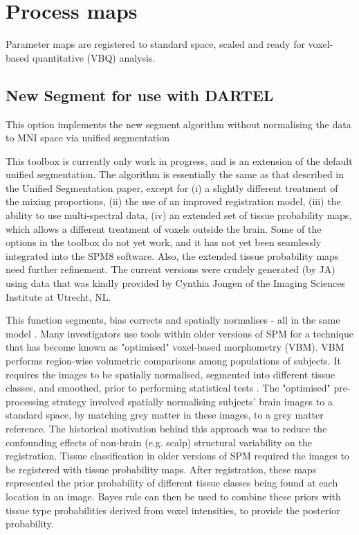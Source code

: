 
\chapter{Process maps  \label{Chap:proc}}

\vskip 1.5cm

Parameter maps are registered to standard space, scaled and ready for voxel-based quantitative (VBQ) analysis.


\section{New Segment for use with DARTEL}
This option implements the new segment algorithm without normalising the data to MNI space via unified segmentation

This toolbox is currently only work in progress, and is an extension of the default unified segmentation.  The algorithm is essentially the same as that described in the Unified Segmentation paper, except for (i) a slightly different treatment of the mixing proportions, (ii) the use of an improved registration model, (iii) the ability to use multi-spectral data, (iv) an extended set of tissue probability maps, which allows a different treatment of voxels outside the brain. Some of the options in the toolbox do not yet work, and it has not yet been seamlessly integrated into the SPM8 software.  Also, the extended tissue probability maps need further refinement. The current versions were crudely generated (by JA) using data that was kindly provided by Cynthia Jongen of the Imaging Sciences Institute at Utrecht, NL.



This function segments, bias corrects and spatially normalises - all in the same model \cite{ashburner05}.  Many investigators use tools within older versions of SPM for a technique that has become known as "optimised" voxel-based morphometry (VBM). VBM performs region-wise volumetric comparisons among populations of subjects. It requires the images to be spatially normalised, segmented into different tissue classes, and smoothed, prior to performing statistical tests \cite{wright_vbm,am_vbmreview,ashburner00b,john_should}. The "optimised" pre-processing strategy involved spatially normalising subjects' brain images to a standard space, by matching grey matter in these images, to a grey matter reference.  The historical motivation behind this approach was to reduce the confounding effects of non-brain (e.g. scalp) structural variability on the registration. Tissue classification in older versions of SPM required the images to be registered with tissue probability maps. After registration, these maps represented the prior probability of different tissue classes being found at each location in an image.  Bayes rule can then be used to combine these priors with tissue type probabilities derived from voxel intensities, to provide the posterior probability.



